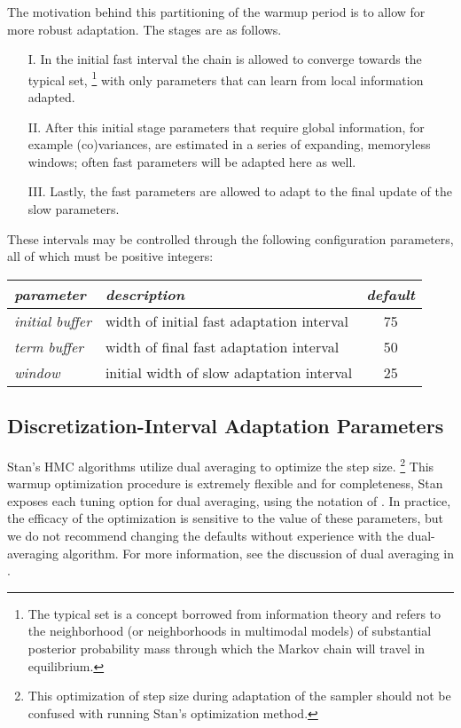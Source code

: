 The motivation behind this partitioning of the warmup period is to
allow for more robust adaptation.  The stages are as follows.

\begin{enumerate}
\item[I.]
In the initial fast interval the chain is allowed to converge
towards the typical set,%
%
\footnote{The typical set is a concept borrowed from information
  theory and refers to the neighborhood (or neighborhoods in
  multimodal models) of substantial posterior probability mass through
  which the Markov chain will travel in equilibrium.}
%
with only parameters that can learn from local information adapted.
\item[II.]
After this initial stage parameters that require global
information, for example (co)variances, are estimated in a series of
expanding, memoryless windows; often fast parameters will be adapted
here as well.
\item[III.]
Lastly, the fast parameters are allowed to adapt to the
final update of the slow parameters.
\end{enumerate}

These intervals may be controlled through the following
configuration parameters, all of which must be positive integers:
%
\begin{center}
\begin{tabular}{l|lc}
{\it parameter} & {\it description} & {\it default}
\\ \hline
{\it initial buffer} & width of initial fast adaptation interval
                     & 75
\\
{\it term buffer} & width of final fast adaptation interval
                  &  50
\\
{\it window}  & initial width of slow adaptation interval
              & 25
\end{tabular}
\end{center}

\subsection{Discretization-Interval Adaptation Parameters}

Stan's HMC algorithms utilize dual averaging \citep{Nesterov:2009} to
optimize the step size.%
%
\footnote{This optimization of step size during
adaptation of the sampler should not be confused with running Stan's
optimization method.}
%
This warmup optimization procedure is extremely flexible and for
completeness, Stan exposes each tuning option for dual averaging,
using the notation of \cite{Hoffman-Gelman:2014}. In practice, the
efficacy of the optimization is sensitive to the value of these
parameters, but we do not recommend changing the defaults without
experience with the dual-averaging algorithm. For more information,
see the discussion of dual averaging in \citep{Hoffman-Gelman:2011,
 Hoffman-Gelman:2014}.

